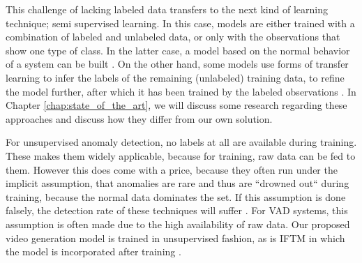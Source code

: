 This challenge of lacking labeled data transfers to the next kind of learning technique; semi supervised learning. In this case, models are either trained with a combination of labeled and unlabeled data, or only with the observations that show one type of class. In the latter case, a model based on the normal behavior of a system can be built \cite{malik2014comparative}. On the other hand, some models use forms of transfer learning to infer the labels of the remaining (unlabeled) training data, to refine the model further, after which it has been trained by the labeled observations \cite{shin2018cctv, shin20203d}. In Chapter \ref{chap:state_of_the_art}, we will discuss some research regarding these approaches and discuss how they differ from our own solution.

For unsupervised anomaly detection, no labels at all are available during training. These makes them widely applicable, because for training, raw data can be fed to them. However this does come with a price, because they often run under the implicit assumption, that anomalies are rare and thus are ``drowned out`` during training, because the normal data dominates the set. If this assumption is done falsely, the detection rate of these techniques will suffer \cite{chandola2009anomaly}. For VAD systems, this assumption is often made \cite{schlegl2017unsupervised, jamadandi2018predgan, akcay2018ganomaly, liu2018future} due to the high availability of raw data. Our proposed video generation model is trained in unsupervised fashion, as is IFTM in which the model is incorporated after training \cite{schmidt2018iftm}. 


